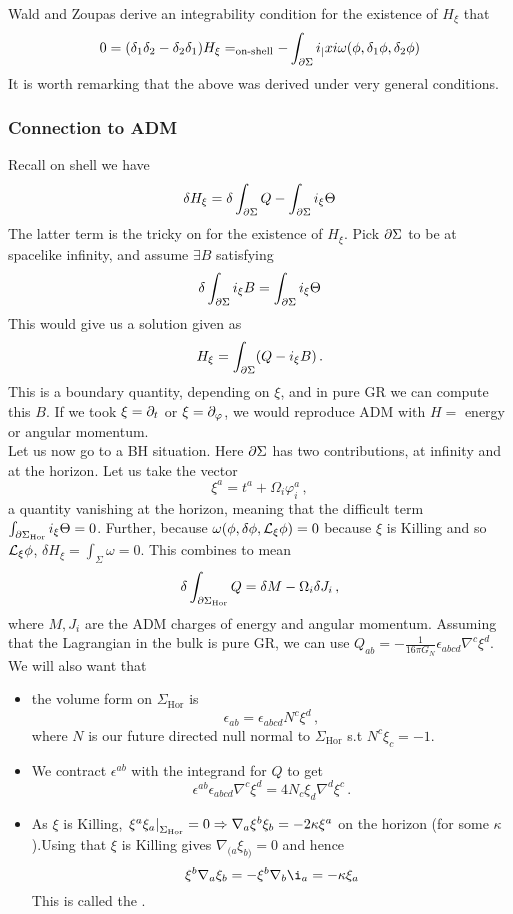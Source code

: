 \documentclass{article}
\begin{document}
Wald and Zoupas derive an integrability condition for the existence of $H_\xi$ that 
\begin{align*}
	0 = (\delta_1 \delta_2 - \delta_2 \delta_1) H_\xi =_{\text{on-shell}} - \int_{\partial \Sigma } i_|xi \omega(\phi, \delta_1 \phi, \delta_2 \phi)
\end{align*}
It is worth remarking that the above was derived under very general conditions. 

\subsubsection{Connection to ADM}
Recall on shell we have 
\[
\delta H_\xi = \delta \int_{\partial \Sigma} Q - \int_{\partial \Sigma} i_\xi \Theta
\]
The latter term is the tricky on for the existence of $H_\xi$. Pick $\partial \Sigma$ to be at spacelike infinity, and assume $\exists B$ satisfying 
\[
\delta \int_{\partial \Sigma} i_\xi B = \int_{\partial \Sigma} i_\xi \Theta
\]
This would give us a solution given as 
\[
H_\xi = \int_{\partial \Sigma} (Q-i_\xi B) \, .
\]
This is a boundary quantity, depending on $\xi$, and in pure GR we can compute this $B$. If we took $\xi = \partial_t$ or $\xi=\partial_\varphi$, we would reproduce ADM with $H=$ energy or angular momentum. \\
Let us now go to a BH situation. Here $\partial \Sigma$ has two contributions, at infinity and at the horizon. Let us take the vector 
\[
\xi^a = t^a + \Omega_i \varphi_i^a \, ,
\]
a quantity vanishing at the horizon, meaning that the difficult term $\int_{\partial \Sigma_{\text{Hor}}} i_\xi \Theta = 0$. Further, because $\omega(\phi, \delta \phi, \mathcal{L}_\xi \phi)=0$ because $\xi$ is Killing and so $\mathcal{L}_\xi \phi$, $\delta H_\xi =\int_\Sigma \omega = 0$. This combines to mean 
\[
\delta \int_{\partial \Sigma_{\text{Hor}}} Q = \delta M - \Omega_i \delta J_i \, ,
\]
where $M, J_i$ are the ADM charges of energy and angular momentum. Assuming that the Lagrangian in the bulk is pure GR, we can use $Q_{ab} = -\frac{1}{16 \pi G_N} \epsilon_{abcd} \nabla^c \xi^d$. We will also want that 
\begin{itemize}
	\item the volume form on $\Sigma_{\text{Hor}}$ is 
	\[
	\epsilon_{ab} = \epsilon_{abcd} N^c \xi^d \, , 
	\]
	where $N$ is our future directed null normal to $\Sigma_{\text{Hor}}$ s.t $N^c \xi_c = -1$. 
	\item We contract $\epsilon^{ab}$ with the integrand for $Q$ to get 
	\[
	\epsilon^{ab} \epsilon_{abcd} \nabla^c \xi^d = 4 N_c \xi_d \nabla^d \xi^c \, .  
	\]
	\item As $\xi$ is Killing, $\left. \xi^a \xi_a \right\rvert_{\Sigma_{\text{Hor}}} = 0 \Rightarrow \nabla_a \xi^b \xi_b = -2 \kappa \xi^a$ on the horizon (for some $\kappa$).Using that $\xi$ is Killing gives $\nabla_{(a}\xi_{b)}=0$ and hence 
	\[
	\xi^b \nabla_a \xi_b = -\xi^b \nabla_b \i_a = -\kappa \xi_a 
	\] 
	This is called the . 
\end{itemize}
\end{document}
